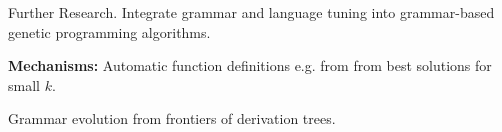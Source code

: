 \begin{frame}
\vspace*{2mm}
\begin{block}{
Further Research.
}
Integrate grammar and language tuning
into grammar-based genetic programming algorithms.
  
{\bf Mechanisms:}
Automatic function definitions e.g. from from best solutions for small $k$.
 
Grammar evolution from frontiers of derivation trees.
\end{block}
\end{frame}